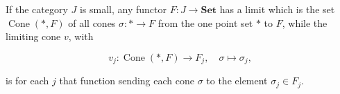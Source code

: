 If the category $J$ is small, any functor $F : J \rightarrow \mathbf{Set}$ has a limit which is the set $\operatorname{Cone}(*, F)$ of all cones $\sigma : * \rightarrow F$ from the one point set $*$ to $F$, while the limiting cone $v$, with

$$v_j : \operatorname{Cone}(*, F) \rightarrow F_j, \quad \sigma \mapsto \sigma_j,$$

is for each $j$ that function sending each cone $\sigma$ to the element $\sigma_j \in F_j$.
